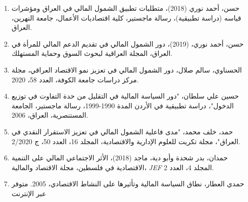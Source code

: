 \documentclass[10pt,a4paper]{report}
\begin{document}
\begin{enumerate}
	\item حسن، أحمد نوري (2018)، متطلبات تطبيق الشمول المالي في العراق ومؤشرات قياسه (دراسة تطبيقية)، رسالة ماجستير، كلية اقتصاديات الأعمال، جامعة النهرين، العراق.
	\item حسن، أحمد نوري، (2019)، دور الشمول المالي في تقديم الدعم المالي للمرأة في العراق، المجلة العراقية لبحوث السوق وحماية المستهلك.
	\item الحسناوي، سالم صلال، دور الشمول المالي في تعزيز نمو الاقتصاد العراقي، مجلة مركز دراسات جامعة الكوفة، العدد 58، 2020.
	\item حسين علي سلطان، "دور السياسة المالية في التقليل من حدة التفاوت في توزيع الدخول"، دراسة تطبيقية في الأردن المدة 1990-1999، رسالة ماجستير، الجامعة المستنصرية، العراق، 2006.
	\item حمد، خلف محمد، "مدى فاعلية الشمول المالي في تعزيز الاستقرار النقدي في العراق"، مجلة تكريت للعلوم الإدارية والاقتصادية، المجلد 16، العدد 50، ج 2/2020.
	\item حمدان، بدر شحدة وأبو دية، ماجد (2018)، الأثر الاجتماعي المالي على التنمية الاقتصادية في فلسطين، مجلة الاقتصاد والمالية، \textit{JEF} المجلد 4، العدد 2.
	\item حمدي العطار، نطاق السياسة المالية وتأثيرها على النشاط 
	الاقتصادي، 2005. متوفر عبر الإنترنت
	

\end{enumerate}
\end{document}
